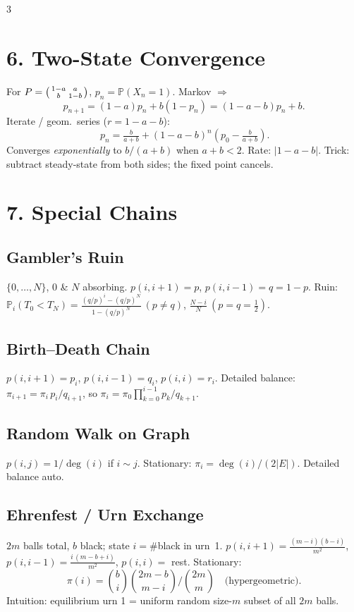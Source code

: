 \documentclass[8pt]{extarticle}
\newcommand{\PR}{\mathbb{P}}
\newcommand{\half}{\tfrac{1}{2}}
\begin{document}
\begin{multicols*}{3}
		\section*{6. Two-State Convergence}
		
		For $P=\begin{psmallmatrix}1-a & a\\ b & 1-b\end{psmallmatrix}$, $p_n=\PR(X_n=1)$. Markov $\Rightarrow$
		\[p_{n+1}=(1-a)p_n+b(1-p_n)=(1-a-b)p_n+b.\]
		Iterate / geom.\ series ($r=1-a-b$):
		\[\boxed{\,p_n=\tfrac{b}{a+b}+(1-a-b)^n\!\left(p_0-\tfrac{b}{a+b}\right).}\]
		Converges \emph{exponentially} to $b/(a+b)$ when $a+b<2$. Rate: $|1-a-b|$. Trick: subtract steady-state from both sides; the fixed point cancels.
		
		\section*{7. Special Chains}
		
		\subsection*{Gambler's Ruin}
		$\{0,\dots,N\}$, $0$ \& $N$ absorbing. $p(i,i+1)=p$, $p(i,i-1)=q=1-p$. Ruin: $\PR_i(T_0<T_N)=\frac{(q/p)^i-(q/p)^N}{1-(q/p)^N}\ (p\ne q)$, $\frac{N-i}{N}\ (p=q=\half)$.
		
		\subsection*{Birth--Death Chain}
		$p(i,i+1)=p_i$, $p(i,i-1)=q_i$, $p(i,i)=r_i$. Detailed balance: $\pi_{i+1}=\pi_i\,p_i/q_{i+1}$, so $\pi_i=\pi_0\prod_{k=0}^{i-1}p_k/q_{k+1}$.
		
		\subsection*{Random Walk on Graph}
		$p(i,j)=1/\deg(i)$ if $i\sim j$. Stationary: $\pi_i=\deg(i)/(2|E|)$. Detailed balance auto.
		
		\subsection*{Ehrenfest / Urn Exchange}
		$2m$ balls total, $b$ black; state $i=\#$black in urn~1.
		$p(i,i+1)=\tfrac{(m-i)(b-i)}{m^2}$, $p(i,i-1)=\tfrac{i\,(m-b+i)}{m^2}$, $p(i,i)=$ rest. Stationary:
		\[\pi(i)=\binom{b}{i}\binom{2m-b}{m-i}\!\Big/\!\binom{2m}{m}\quad\text{(hypergeometric)}.\]
		Intuition: equilibrium urn 1 = uniform random size-$m$ subset of all $2m$ balls.
		

\end{multicols*}
\end{document}
